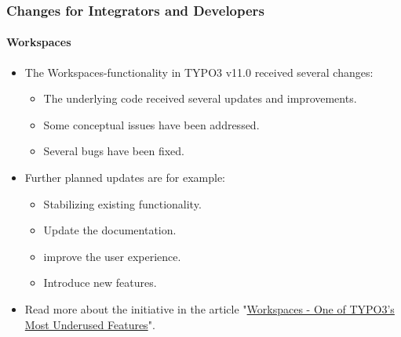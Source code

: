 %

\begin{frame}[fragile]
	\frametitle{Changes for Integrators and Developers}
	\framesubtitle{Workspaces}

	\begin{itemize}
		\item The Workspaces-functionality in TYPO3 v11.0 received several changes:

			\begin{itemize}
				\item The underlying code received several updates and improvements.
				\item Some conceptual issues have been addressed.
				\item Several bugs have been fixed.
			\end{itemize}

		\item Further planned updates are for example:

			\begin{itemize}
				\item Stabilizing existing functionality.
				\item Update the documentation.
				\item improve the user experience.
				\item Introduce new features.
			\end{itemize}

		\item Read more about the initiative in the article
			"\href{https://typo3.org/article/workspaces-one-of-typo3s-most-underused-features}{Workspaces - One of TYPO3's Most Underused Features}​".

	\end{itemize}

\end{frame}


